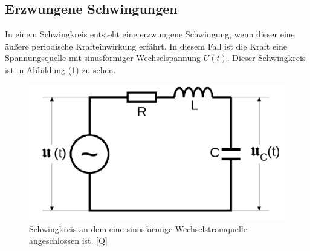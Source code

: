 \subsection{Erzwungene Schwingungen}
In einem Schwingkreis entsteht eine erzwungene Schwingung, wenn dieser eine äußere 
periodische Krafteinwirkung erfährt. In diesem Fall ist die Kraft eine Spannungsquelle
mit sinusförmiger Wechselspannung $U(t)$. Dieser Schwingkreis ist in Abbildung 
(\ref{pic:erzwungene_Schwingung_Schwingkreis}) zu sehen. 

\begin{figure}[H]
    \centering
    \includegraphics[width=0.5\linewidth]{erzwungene_Schwingung_Schwingkreis.png}
    \caption{Schwingkreis an dem eine sinusförmige Wechselstromquelle angeschlossen ist. [Q\cite{anleitungV354}]}
    \label{pic:erzwungene_Schwingung_Schwingkreis}
\end{figure}

